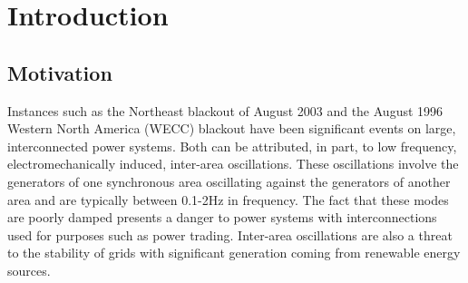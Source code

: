 \documentclass[conference]{IEEEtran}
\begin{document}
%
\IEEEpeerreviewmaketitle

\section{Introduction}
\subsection{Motivation}
Instances such as the Northeast blackout of August 2003 and the August 1996 Western North America (WECC)\cite{NAERC} blackout have been significant events on large, interconnected power systems. Both can be attributed, in part, to low frequency, electromechanically induced, inter-area oscillations\cite{NAERC}. These oscillations involve the generators of one synchronous area oscillating against the generators of another area and are typically between 0.1-2Hz in frequency. The fact that these modes are poorly damped\cite{WAPODNorway} presents a danger to power systems with interconnections used for purposes such as power trading. Inter-area oscillations are also a threat to the stability of grids with significant generation coming from renewable energy sources.
\end{document}
